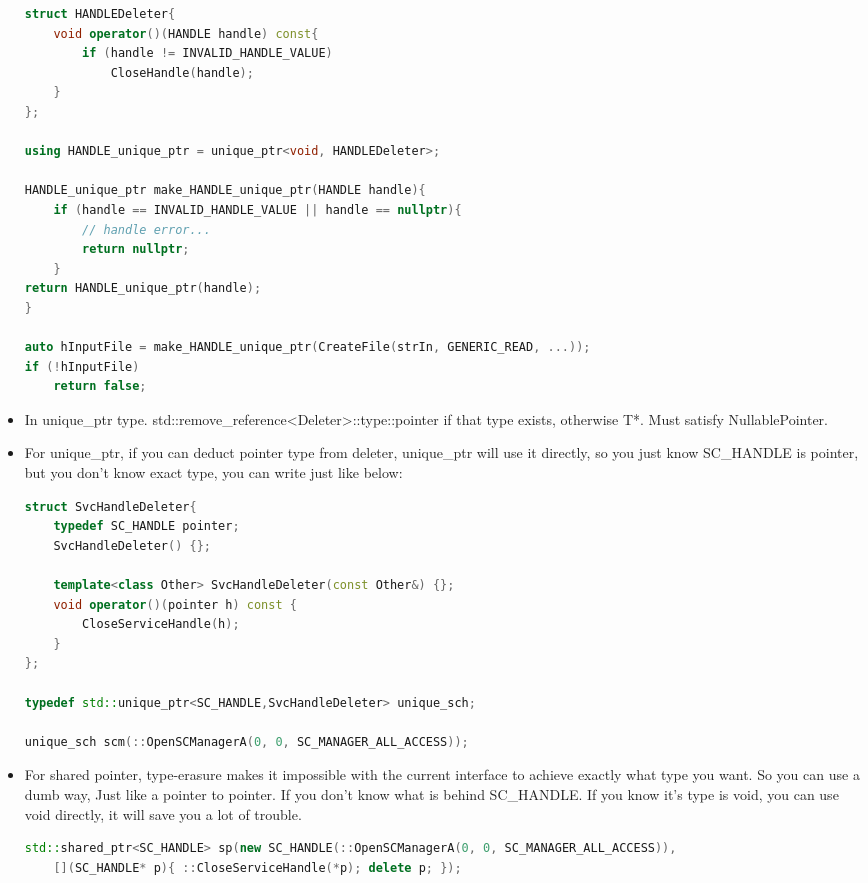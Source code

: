 \documentclass[a4paper,12pt,twoside]{book}
\begin{document}
\begin{itemize}
\begin{lstlisting}[frame=single, language=c++]
struct HANDLEDeleter{
    void operator()(HANDLE handle) const{
        if (handle != INVALID_HANDLE_VALUE)
            CloseHandle(handle);
    }
};

using HANDLE_unique_ptr = unique_ptr<void, HANDLEDeleter>;

HANDLE_unique_ptr make_HANDLE_unique_ptr(HANDLE handle){
    if (handle == INVALID_HANDLE_VALUE || handle == nullptr){
        // handle error...
        return nullptr;
    }
return HANDLE_unique_ptr(handle);
}

auto hInputFile = make_HANDLE_unique_ptr(CreateFile(strIn, GENERIC_READ, ...));
if (!hInputFile)
    return false;
\end{lstlisting}

\item In unique\_ptr type. std::remove\_reference<Deleter>::type::pointer if that type exists, otherwise T*. Must satisfy NullablePointer.

\item For unique\_ptr, if you can deduct pointer type from deleter, unique\_ptr will use it directly, so you just know SC\_HANDLE is pointer, but you don't know exact type, you can write just like below: 
\begin{lstlisting}[frame=single, language=c++]
struct SvcHandleDeleter{
    typedef SC_HANDLE pointer;
    SvcHandleDeleter() {};

    template<class Other> SvcHandleDeleter(const Other&) {};
    void operator()(pointer h) const {
        CloseServiceHandle(h);
    }
};

typedef std::unique_ptr<SC_HANDLE,SvcHandleDeleter> unique_sch;

unique_sch scm(::OpenSCManagerA(0, 0, SC_MANAGER_ALL_ACCESS));
\end{lstlisting}

\item For shared pointer, type-erasure makes it impossible with the current interface to achieve exactly what type you want. So you can use a dumb way, Just like a pointer to pointer. If you don't know what is behind SC\_HANDLE. If you know it's type is void, you can use void directly, it will save you a lot of trouble. 

\begin{lstlisting}[frame=single, language=c++]
std::shared_ptr<SC_HANDLE> sp(new SC_HANDLE(::OpenSCManagerA(0, 0, SC_MANAGER_ALL_ACCESS)),
    [](SC_HANDLE* p){ ::CloseServiceHandle(*p); delete p; });
\end{lstlisting}


\end{itemize}
\end{document}
